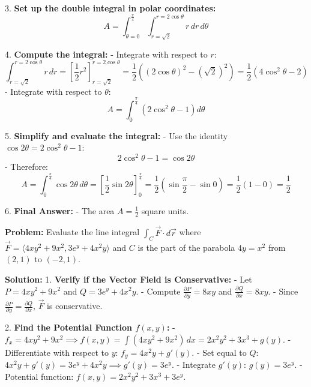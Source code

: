 \documentclass[9pt]{article}
\begin{document}
\begin{multicols}{2}
\begin{tcolorbox}[title=\textbf{Example: Computing Area Between Circles}, colframe=lightpink]
    3. \textbf{Set up the double integral in polar coordinates:}
       \[ A = \int_{\theta = 0}^{\frac{\pi}{4}} \int_{r = \sqrt{2}}^{r = 2 \cos \theta} r \, dr \, d\theta \]
    
    4. \textbf{Compute the integral:}
       - Integrate with respect to \( r \):
         \[ \int_{r = \sqrt{2}}^{r = 2 \cos \theta} r \, dr = \left[ \frac{1}{2} r^2 \right]_{r = \sqrt{2}}^{r = 2 \cos \theta} = \frac{1}{2} \left( (2 \cos \theta)^2 - (\sqrt{2})^2 \right) = \frac{1}{2} \left( 4 \cos^2 \theta - 2 \right) \]
       - Integrate with respect to \( \theta \):
         \[ A = \int_{0}^{\frac{\pi}{4}} \left( 2 \cos^2 \theta - 1 \right) d\theta \]
    
    5. \textbf{Simplify and evaluate the integral:}
       - Use the identity \( \cos 2\theta = 2 \cos^2 \theta - 1 \):
         \[ 2 \cos^2 \theta - 1 = \cos 2\theta \]
       - Therefore:
         \[ A = \int_{0}^{\frac{\pi}{4}} \cos 2\theta \, d\theta = \left[ \frac{1}{2} \sin 2\theta \right]_{0}^{\frac{\pi}{4}} = \frac{1}{2} \left( \sin \frac{\pi}{2} - \sin 0 \right) = \frac{1}{2} (1 - 0) = \frac{1}{2} \]
    
    6. \textbf{Final Answer:}
       - The area \( A = \frac{1}{2} \) square units.
\end{tcolorbox} 


\begin{tcolorbox}[title=\textbf{Example: Evaluating a Line Integral}, colframe=lightpink]
    \textbf{Problem:} Evaluate the line integral \( \int_C \vec{F} \cdot d\vec{r} \) where \( \vec{F} = \langle 4xy^2 + 9x^2, 3e^y + 4x^2 y \rangle \) and \( C \) is the part of the parabola \( 4y = x^2 \) from \( (2, 1) \) to \( (-2, 1) \).
    
    \textbf{Solution:}
    1. \textbf{Verify if the Vector Field is Conservative:}
       - Let \( P = 4xy^2 + 9x^2 \) and \( Q = 3e^y + 4x^2 y \).
       - Compute \( \frac{\partial P}{\partial y} = 8xy \) and \( \frac{\partial Q}{\partial x} = 8xy \).
       - Since \( \frac{\partial P}{\partial y} = \frac{\partial Q}{\partial x} \), \( \vec{F} \) is conservative.
    
    2. \textbf{Find the Potential Function \( f(x, y) \):}
       - \( f_x = 4xy^2 + 9x^2 \implies f(x, y) = \int (4xy^2 + 9x^2) \, dx = 2x^2 y^2 + 3x^3 + g(y) \).
       - Differentiate with respect to \( y \): \( f_y = 4x^2 y + g'(y) \).
       - Set equal to \( Q \): \( 4x^2 y + g'(y) = 3e^y + 4x^2 y \implies g'(y) = 3e^y \).
       - Integrate \( g'(y) \): \( g(y) = 3e^y \).
       - Potential function: \( f(x, y) = 2x^2 y^2 + 3x^3 + 3e^y \).
    

\end{tcolorbox}
\end{multicols}
\end{document}
